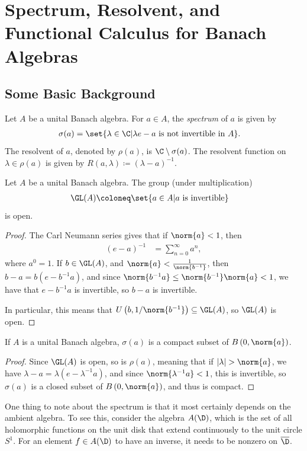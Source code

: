 \documentclass[10pt]{mypackage}
\begin{document}
\RaggedRight
\section{Spectrum, Resolvent, and Functional Calculus for Banach Algebras}%
\subsection{Some Basic Background}%
\begin{definition}
  Let $A$ be a unital Banach algebra. For $a\in A$, the \textit{spectrum} of $a$ is given by
  \begin{align*}
    \sigma(a) &= \set{\lambda\in \C | \lambda e - a \text{ is not invertible in }A}.
  \end{align*}
  The resolvent of $a$, denoted by $\rho(a)$, is $\C\setminus \sigma(a)$. The resolvent function on $\lambda\in \rho(a)$ is given by $R\left( a,\lambda \right)\coloneq \left( \lambda - a \right)^{-1}$.
\end{definition}
\begin{proposition}
  Let $A$ be a unital Banach algebra. The group (under multiplication)
  \begin{align*}
    \GL(A) &\coloneq \set{a\in A | a\text{ is invertible}}
  \end{align*}
  is open.
\end{proposition}
\begin{proof}
  The Carl Neumann series gives that if $\norm{a} < 1$, then
  \begin{align*}
    \left( e-a \right)^{-1} &= \sum_{n=0}^{\infty}a^n,
  \end{align*}
  where $a^0 = 1$. If $b\in \GL(A)$, and $\norm{a} < \frac{1}{\norm{b^{-1}}}$, then $b-a = b\left( e-b^{-1}a \right)$, and since $\norm{b^{-1}a} \leq \norm{b^{-1}}\norm{a} < 1$, we have that $e-b^{-1}a$ is invertible, so $b-a$ is invertible.

  In particular, this means that $U\left( b,1/\norm{b^{-1}} \right)\subseteq \GL(A)$, so $\GL(A)$ is open.
\end{proof}
\begin{corollary}
  If $A$ is a unital Banach algebra, $\sigma(a)$ is a compact subset of $B\left( 0,\norm{a} \right)$.
\end{corollary}
\begin{proof}
  Since $\GL(A)$ is open, so is $\rho(a)$, meaning that if $\left\vert \lambda \right\vert > \norm{a}$, we have $\lambda - a = \lambda\left( e-\lambda^{-1}a \right)$, and since $\norm{\lambda^{-1}a} < 1$, this is invertible, so $\sigma(a)$ is a closed subset of $B\left( 0,\norm{a} \right)$, and thus is compact.
\end{proof}
One thing to note about the spectrum is that it most certainly depends on the ambient algebra. To see this, consider the algebra $A(\D)$, which is the set of all holomorphic functions on the unit disk that extend continuously to the unit circle $S^{1}$. For an element $f\in A(\D)$ to have an inverse, it needs to be nonzero on $ \overline{\D} $.
\end{document}
